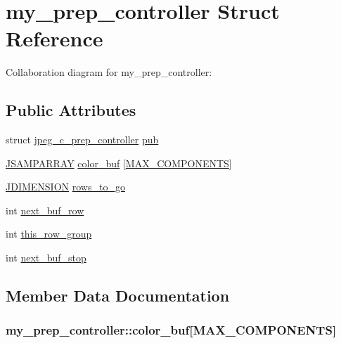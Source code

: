 \hypertarget{structmy__prep__controller}{}\section{my\+\_\+prep\+\_\+controller Struct Reference}
\label{structmy__prep__controller}


Collaboration diagram for my\+\_\+prep\+\_\+controller\+:
\subsection*{Public Attributes}
\begin{DoxyCompactItemize}
\item 
struct \hyperlink{structjpeg__c__prep__controller}{jpeg\+\_\+c\+\_\+prep\+\_\+controller} \hyperlink{structmy__prep__controller_a3fb45ffb334d46e9786e32eefded333a}{pub}
\item 
\hyperlink{jpeglib_8h_ac9d5d1b829ed51769db69a37271a7e91}{J\+S\+A\+M\+P\+A\+R\+R\+A\+Y} \hyperlink{structmy__prep__controller_ac1479671472328faf5d381a202658783}{color\+\_\+buf} \mbox{[}\hyperlink{jmorecfg_8h_a6d8c910a1fdb6d4762a05f7250e64322}{M\+A\+X\+\_\+\+C\+O\+M\+P\+O\+N\+E\+N\+T\+S}\mbox{]}
\item 
\hyperlink{jmorecfg_8h_a04ed4674f6f1d0d50ec241531e38274f}{J\+D\+I\+M\+E\+N\+S\+I\+O\+N} \hyperlink{structmy__prep__controller_a824b65d503dae6698d6a482d49a8043c}{rows\+\_\+to\+\_\+go}
\item 
int \hyperlink{structmy__prep__controller_af93cf69d2ea14660586c93a1b08774a2}{next\+\_\+buf\+\_\+row}
\item 
int \hyperlink{structmy__prep__controller_a2fd911bc5ad6043822b493554513b8bb}{this\+\_\+row\+\_\+group}
\item 
int \hyperlink{structmy__prep__controller_a1332bc531a2d55aaef228a3a9a3fd62f}{next\+\_\+buf\+\_\+stop}
\end{DoxyCompactItemize}


\subsection{Member Data Documentation}
\hypertarget{structmy__prep__controller_ac1479671472328faf5d381a202658783}{}
\subsubsection[{color\+\_\+buf}]{ my\+\_\+prep\+\_\+controller\+::color\+\_\+buf\mbox{[}{\bf M\+A\+X\+\_\+\+C\+O\+M\+P\+O\+N\+E\+N\+T\+S}\mbox{]}}\label{structmy__prep__controller_ac1479671472328faf5d381a202658783}
\hypertarget{structmy__prep__controller_af93cf69d2ea14660586c93a1b08774a2}{}
